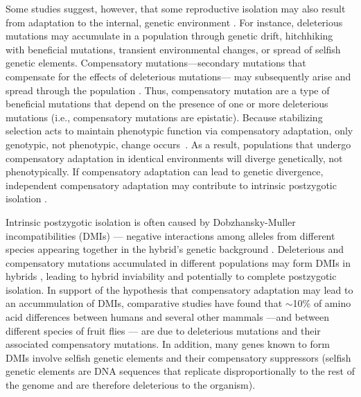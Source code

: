 \documentclass{article}
\begin{document}
Some studies suggest, however, that some reproductive isolation
may also result from adaptation to the internal, genetic environment
\cite{pha09,pre10}.
%
For instance, deleterious mutations may accumulate in a population
through genetic drift, hitchhiking with beneficial mutations,
transient environmental changes, or spread of selfish genetic elements.
%
Compensatory mutations---secondary mutations that compensate
for the effects of deleterious mutations---%
may subsequently arise and spread through the population
\cite{har96,bur99,moo00,lev00,mai02,est03,est11}.
%
Thus, compensatory mutation are a type of beneficial mutations
that depend on the presence of one or more deleterious mutations
(i.e., compensatory mutations are epistatic).
%
Because stabilizing selection acts
to maintain phenotypic function via compensatory adaptation,
only genotypic, not phenotypic, change occurs~\cite{har96}.
%
As a result, populations that undergo compensatory adaptation
in identical environments will diverge genetically, not phenotypically.
%
If compensatory adaptation can lead to genetic divergence,
independent compensatory adaptation may contribute to
intrinsic postzygotic isolation \cite{orr01,kon02,kul04,lan07,sch09b,pre10}.



Intrinsic postzygotic isolation is often caused by
Dob\-zhan\-sky-Mul\-ler incompatibilities (DMIs) \cite{coy04}---%
negative interactions among alleles from different species appearing together
in the hybrid's genetic background \cite{orr95}.
%
Deleterious and compensatory mutations accumulated in different populations
may form DMIs in hybrids \cite{har96}, leading to hybrid inviability
and potentially to complete postzygotic isolation.
%
In support of the hypothesis that compensatory adaptation
may lead to an accummulation of DMIs,
comparative studies have found that $\sim$10\%
of amino acid differences between humans
and several other mammals \cite{kon02}%
---and between different species of fruit flies \cite{kul04}---%
are due to deleterious mutations and their associated compensatory mutations.
%
In addition, many genes known to form DMIs
involve selfish genetic elements
and their compensatory suppressors \cite{pre10}
(selfish genetic elements are DNA sequences
that replicate disproportionally to the rest
of the genome and are therefore deleterious to the organism).
\end{document}
